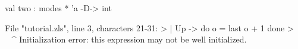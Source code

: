 \chklistingfalse
{}
\begin{ChkListingMsg}
val two : modes * 'a -D-> int
\end{ChkListingMsg}
\begin{ChkListingErr}
File "tutorial.zls", line 3, characters 21-31:
>      | Up -> do o = last o + 1 done
>                     ^^^^^^^^^^
Initialization error: this expression may not be well initialized.
\end{ChkListingErr}
